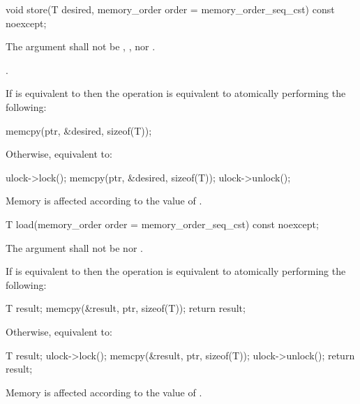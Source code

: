 \begin{itemdecl}
void store(T desired, memory_order order = memory_order_seq_cst) const noexcept;
\end{itemdecl}

\begin{itemdescr}
\pnum
\removed{\requires}\added{\expects} The  argument shall not be
,
, nor
.

\pnum
{}.
\begin{addedblock}
\effects If  is equivalent to 
then the operation is equivalent to atomically performing the following:
\begin{codeblock}
  memcpy(ptr, &desired, sizeof(T));
\end{codeblock}
Otherwise, equivalent to:
\begin{codeblock}
  ulock->lock();
  memcpy(ptr, &desired, sizeof(T));
  ulock->unlock();
\end{codeblock}
\end{addedblock}
Memory is affected according to the value of .
\end{itemdescr}


\begin{itemdecl}
T load(memory_order order = memory_order_seq_cst) const noexcept;
\end{itemdecl}

\begin{itemdescr}
\pnum
\removed{\requires}\added{\expects} The  argument shall not be
 nor .

\begin{addedblock}
\pnum
\effects If  is equivalent to  then the
operation is equivalent to atomically performing the following:
\begin{codeblock}
  T result;
  memcpy(&result, ptr, sizeof(T));
  return result;
\end{codeblock}
Otherwise, equivalent to:
\begin{codeblock}
  T result;
  ulock->lock();
  memcpy(&result, ptr, sizeof(T));
  ulock->unlock();
  return result;
\end{codeblock}
\end{addedblock}
Memory is affected according to the value of .

\end{itemdescr}



